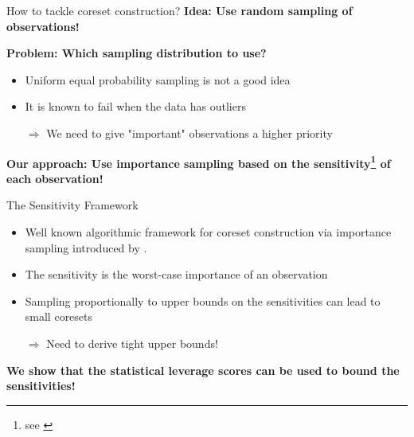 \documentclass[gray]{beamer}
\begin{document}
\begin{frame}{How to tackle coreset construction?}
    \textbf{Idea: Use random sampling of observations!}

    \vspace{\fill}

    \textbf{Problem: Which sampling distribution to use?}
    \begin{itemize}
        \item Uniform equal probability sampling is not a good idea
        \item It is known to fail when the data has outliers
        \item[$\Rightarrow$] We need to give "important" observations a
              higher priority
    \end{itemize}

    \vspace{\fill}

    \textbf{Our approach: Use importance sampling based on the
        sensitivity\footnote{see \cite{langberg-schulman-sensitivities}} of each observation!}
\end{frame}

\begin{frame}{The Sensitivity Framework}

    \begin{itemize}
        \item Well known algorithmic framework for coreset construction via
              importance sampling introduced by \cite{feldman-langberg-coresets}.
        \item The sensitivity is the worst-case importance of an observation
        \item Sampling proportionally to upper bounds on the sensitivities
              can lead to small coresets
        \item[$\Rightarrow$] Need to derive tight upper bounds!
    \end{itemize}

    \vspace{\fill}

    \textbf{We show that the statistical leverage scores can be
        used to bound the sensitivities!}

\end{frame}
\end{document}
